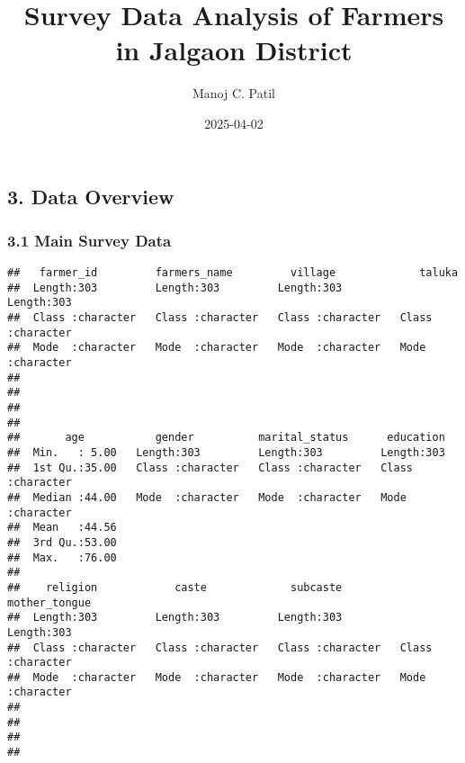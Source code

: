 \documentclass[
]{article}
\title{Survey Data Analysis of Farmers in Jalgaon District}
\author{Manoj C. Patil}
\date{2025-04-02}
\begin{document}
\maketitle

\subsection{3. Data Overview}\label{data-overview}

\subsubsection{3.1 Main Survey Data}\label{main-survey-data}

\begin{verbatim}
##   farmer_id         farmers_name         village             taluka         
##  Length:303         Length:303         Length:303         Length:303        
##  Class :character   Class :character   Class :character   Class :character  
##  Mode  :character   Mode  :character   Mode  :character   Mode  :character  
##                                                                             
##                                                                             
##                                                                             
##                                                                             
##       age           gender          marital_status      education        
##  Min.   : 5.00   Length:303         Length:303         Length:303        
##  1st Qu.:35.00   Class :character   Class :character   Class :character  
##  Median :44.00   Mode  :character   Mode  :character   Mode  :character  
##  Mean   :44.56                                                           
##  3rd Qu.:53.00                                                           
##  Max.   :76.00                                                           
##                                                                          
##    religion            caste             subcaste         mother_tongue     
##  Length:303         Length:303         Length:303         Length:303        
##  Class :character   Class :character   Class :character   Class :character  
##  Mode  :character   Mode  :character   Mode  :character   Mode  :character  
##                                                                             
##                                                                             
##                                                                             
##                                                                             

\end{verbatim}
\end{document}
